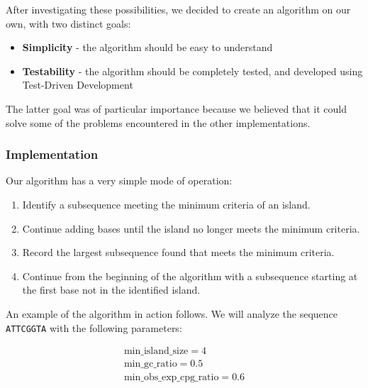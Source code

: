 \documentclass{bioinfo}
\newcommand{\dnaseq}[1]{\texttt{#1}}
\begin{document}
After investigating these possibilities, we decided to create an
algorithm on our own, with two distinct goals:

\begin{itemize}
\item \textbf{Simplicity} - the algorithm should be easy to understand
\item \textbf{Testability} - the algorithm should be completely tested, and
  developed using Test-Driven Development
\end{itemize}

The latter goal was of particular importance because we believed that
it could solve some of the problems encountered in the other
implementations.

\subsubsection{Implementation}

Our algorithm has a very simple mode of operation:

\begin{enumerate}
\item Identify a subsequence meeting the minimum criteria of an island.
\item Continue adding bases until the island no longer meets the
  minimum criteria.
\item Record the largest subsequence found that meets the minimum criteria.
\item Continue from the beginning of the algorithm with a subsequence
  starting at the first base not in the identified island.
\end{enumerate}

An example of the algorithm in action follows. We will analyze the
sequence \dnaseq{ATTCGGTA} with the following parameters:

\begin{eqnarray*}
  \mbox{min\_island\_size} = 4 \\
  \mbox{min\_gc\_ratio} = 0.5 \\
  \mbox{min\_obs\_exp\_cpg\_ratio} = 0.6 \\
\end{eqnarray*}
\end{document}
